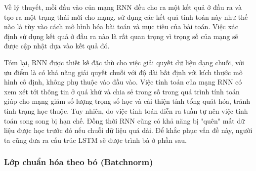 Về lý thuyết, mỗi đầu vào của mạng RNN đều cho ra một kết quả ở đầu ra và tạo ra một trạng thái mới cho mạng, sử dụng các kết quả tính toán này như thế nào là tùy vào cách mô hình hóa bài toán và mục tiêu của bài toán. Việc xác định sử dụng kết quả ở đầu ra nào là rất quan trọng vì trọng số của mạng sẽ được cập nhật dựa vào kết quả đó.

Tóm lại, RNN được thiết kế đặc thù cho việc giải quyết dữ liệu dạng chuỗi, với ưu điểm là có khả năng giải quyết chuỗi với độ dài bất định với kích thước mô hình cô định, không phụ thuộc vào đầu vào. Việc tính toán của mạng RNN có xem xét tới thông tin ở quá khứ và chia sẻ trong số trong quá trình tính toán giúp cho mạng giảm số lượng trọng số học và cải thiện tính tổng quát hóa, tránh tình trạng học thuộc. Tuy nhiên, do việc tính toán diễn ra tuần tự nên việc tính toán song song bị hạn chế. Đồng thời RNN cũng có khả năng bị "quên" mất dữ liệu được học trước đó nếu chuỗi dữ liệu quá dài. Để khắc phục vấn đề này, người ta cũng đưa ra cấu trúc LSTM sẽ được trình bà ở phần sau.




\subsubsection{Lớp chuẩn hóa theo bó (Batchnorm)}


